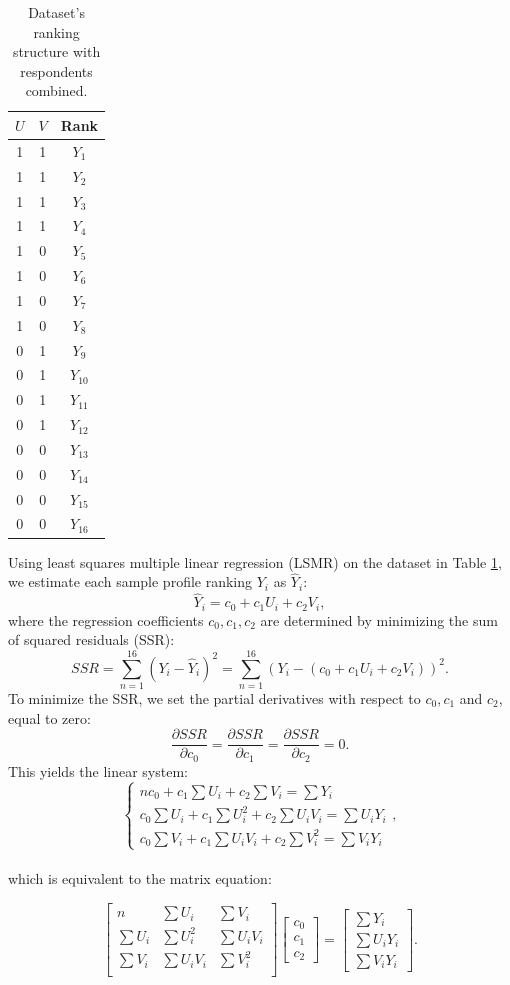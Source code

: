 \documentclass[a4paper, 12pt]{article}
\begin{document}
\begin{table}[!htpb]
	\centering
	\small
	\begin{tabular}{cc|c}
		$U$ & $V$ & Rank\\ \hline
		1&	1&	$Y_1$\\
		1&	1&	$Y_2$\\
		1&	1&	$Y_3$\\
		1&	1&	$Y_4$\\
		1&	0&	$Y_5$\\
		1&	0&	$Y_6$\\
		1&	0&	$Y_7$\\
		1&	0&	$Y_8$\\
		0&	1&	$Y_9$\\
		0&	1&	$Y_{10}$\\
		0&	1&	$Y_{11}$\\
		0&	1&	$Y_{12}$\\
		0&	0&	$Y_{13}$\\
		0&	0&	$Y_{14}$\\
		0&	0&	$Y_{15}$\\
		0&	0&	$Y_{16}$\\\hline
	\end{tabular}
	\caption{{\small Dataset's ranking structure with respondents combined.}}
	\label{Tab8}
\end{table}
Using least squares multiple linear regression (LSMR) on the dataset in Table \ref{Tab8}, we estimate each sample profile ranking $Y_i$ as $\hat{Y}_i$:
$$
\hat{Y}_i=c_0 + c_1 U_i + c_2 V_i,
$$
{\flushleft where} the regression coefficients $c_0,c_1,c_2$ are determined by minimizing the sum of squared residuals (SSR):
$$
SSR = \sum_{n=1}^{16}(Y_i-\hat{Y}_i)^2
=\sum_{n=1}^{16}(Y_i-(c_0 + c_1 U_i + c_2 V_i))^2.
$$
To minimize the SSR, we set the partial derivatives with respect to $c_0,c_1$ and $c_2$, equal to zero:
$$\frac{\partial SSR}{\partial c_0} = \frac{\partial SSR}{\partial c_1} = \frac{\partial SSR}{\partial c_2} = 0.$$
This yields the linear system:
$$\begin{cases}
nc_0 +  c_1\sum U_i + c_2\sum V_i = \sum Y_i\\
c_0\sum U_i + c_1\sum U_i^2 + c_2\sum U_iV_i = \sum U_iY_i\\
c_0\sum V_i + c_1\sum U_iV_i + c_2\sum V_i^2 = \sum V_iY_i
\end{cases},$$\\
which is equivalent to the matrix equation:

\[
\begin{bmatrix}
n& \sum U_i& \sum V_i \\
\sum U_i&\sum U_i^2&\sum U_iV_i\\
\sum V_i& \sum U_iV_i& \sum V_i^2\\

\end{bmatrix}
%
\begin{bmatrix}
c_0 \\
c_1\\
c_2
\end{bmatrix}
=
\begin{bmatrix}
\sum Y_i\\
\sum U_iY_i\\
\sum V_iY_i
\end{bmatrix}
.
\]
\end{document}
